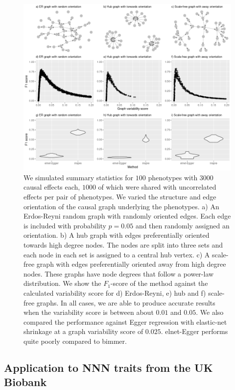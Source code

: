 \documentclass{article}
\begin{document}
\begin{figure}\label{figure4}
\includegraphics[width=\textwidth]{figures/figure4.png}
\caption{We simulated summary statistics for $100$ phenotypes with $3000$ causal
effects each, $1000$ of which were shared with uncorrelated effects per pair of phenotypes.
We varied the structure and edge orientation of the causal graph underlying the phenotypes.
a) An Erdos-Reyni random graph with randomly oriented edges. Each edge is
included with probability $p=0.05$ and then randomly assigned an orientation. b) A hub
graph with edges preferentially oriented towards high degree nodes. The nodes are split into
three sets and each node in each set is assigned to a central hub vertex. c) A scale-free
graph with edges preferentially oriented away from high degree nodes. These graphs have
node degrees that follow a power-law distribution. We show the $F_1$-score of the method
against the calculated variability score for d) Erdos-Reyni, e) hub and f) scale-free graphs.
In all cases, we are able to produce accurate results when the variability score is between
about $0.01$ and $0.05$. We also compared the performance against Egger regression
with elastic-net shrinkage at a graph variability score of $0.025$. elnet-Egger
performs quite poorly compared to bimmer.
}
\end{figure}


\subsection{Application to NNN traits from the UK Biobank}
\end{document}
